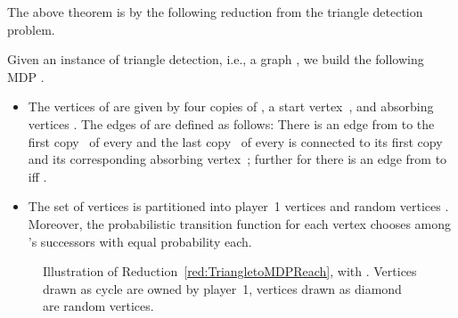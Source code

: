 \documentclass[11pt,letterpaper]{article}
\newif\iffullversion
\newcommand{\infull}[1]{\iffullversion #1\fi}
\newcommand{\inshort}[1]{\iffullversion \else #1\fi}
\begin{document}
The above theorem is by the following reduction from the triangle detection problem.
\begin{reduction}\label{red:TriangletoMDPReach}
 Given an instance of triangle detection, i.e., a graph ,
 we build the following MDP . 
 \begin{itemize}
  \item  The vertices  of  are given by four copies 
   of , a start vertex~, and absorbing vertices 
  . The edges  of  are defined as follows:
  There is an edge from  to the first copy~ of every  
  and the last copy~ of every  is connected to its first copy~
  and its corresponding absorbing vertex~; further for 
  there is an edge from  to  iff .
	  
  \item The set of vertices  is partitioned into player~1 vertices 
	and random vertices .
	Moreover, the probabilistic transition function for each vertex  
	chooses among 's successors with equal probability  each.
	
 \end{itemize}
\end{reduction}
\begin{figure}
 \centering
 \infull{
 \caption{Illustration of Reduction~\ref{red:TriangletoMDPReach}, with . Vertices drawn as cycle are owned by player~1,
vertices drawn as diamond are random vertices.}
 }
 \inshort{
 \caption{Illustration of Reduction~\ref{red:TriangletoMDPReach}, with  . Vertices drawn as cycle are owned by player~1,
vertices drawn as diamond are random vertices.}
 }
 
 \label{fig:TriangletoMDPReach}
\end{figure}
\end{document}
